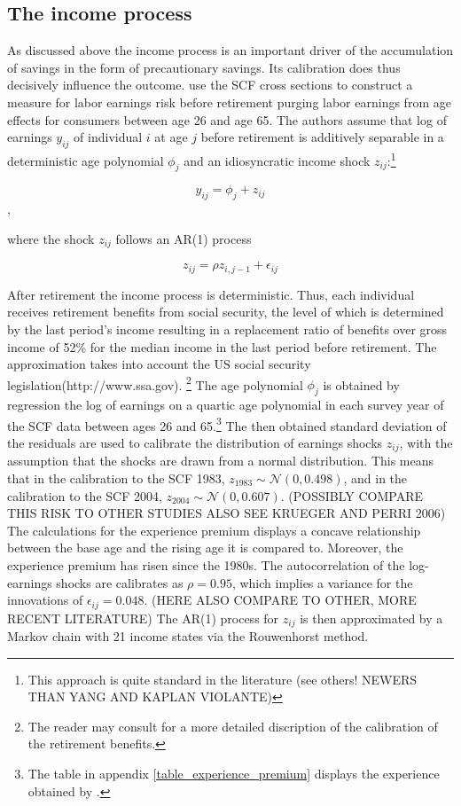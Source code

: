 \documentclass[a4paper,12pt]{article}
\begin{document}
\subsection{The income process}
As discussed above the income process is an important driver of the accumulation of savings in the form of precautionary savings. Its calibration does thus decisively influence the outcome. 
\cite{hintermaier2011} use the SCF cross sections to construct a measure for labor earnings risk before retirement purging labor earnings from age effects for consumers between age 26 and age 65. The authors assume that log of earnings $y_{ij}$ of individual $i$ at age $j$ before retirement is additively separable in a deterministic age polynomial $\phi_{j}$ and an idiosyncratic income shock $z_{ij}$:\footnote{This approach is quite standard in the literature (see others! NEWERS THAN YANG AND KAPLAN VIOLANTE) } 

\[y_{ij}=\phi_{j}+z_{ij}\],

where the shock $z_{ij}$ follows an AR(1) process

\[z_{ij} = \rho z_{i,j-1}+\epsilon_{ij}\]

After retirement the income process is deterministic. Thus, each individual receives retirement benefits from social security, the level of which is determined by the last period's income resulting in a replacement ratio of benefits over gross income of 52\% for the median income in the last period before retirement. The approximation takes into account the US social security legislation(http://www.ssa.gov). \footnote{The reader may consult \cite{hintermaier2011} for a more detailed discription of the calibration of the retirement benefits.} The age polynomial $\phi_{j}$ is obtained by  regression the log of earnings on a quartic age polynomial in each survey year of the SCF data between ages 26 and 65.\footnote{The table in appendix \ref{table_experience_premium} displays the experience obtained by \cite{hintermaier2011}.} The then obtained standard deviation of the residuals are used to calibrate the distribution of earnings shocks $z_{ij}$, with the assumption that the shocks are drawn from a normal distribution. This means that in the calibration to the SCF 1983, $z_{1983} \sim \mathcal{N}(0,0.498)$, and in the calibration to the SCF 2004, $z_{2004} \sim \mathcal{N}(0,0.607)$. (POSSIBLY COMPARE THIS RISK TO OTHER STUDIES ALSO SEE KRUEGER AND PERRI 2006) The calculations for the experience premium displays a concave relationship between the base age and the rising age it is compared to. Moreover, the experience premium has risen since the 1980s. The autocorrelation of the log-earnings shocks are calibrates as $\rho = 0.95$, which implies a variance for the innovations of $\epsilon_{ij} = 0.048$. (HERE ALSO COMPARE TO OTHER, MORE RECENT LITERATURE) The AR(1) process for $z_{ij}$ is then approximated by a Markov chain with 21 income states via the Rouwenhorst method.\\
\end{document}
